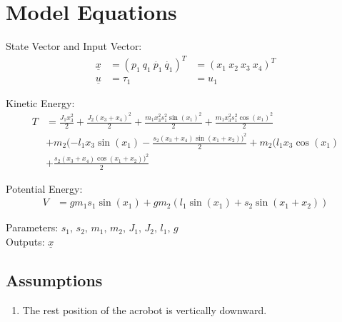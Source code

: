 \documentclass[10pt,a4paper]{article}
\begin{document}
	
	\section{Model Equations} %
	
	State Vector and Input Vector:
	\begin{align*}
		\underline{x} &= (p_1 \ q_1 \ \dot{p_1} \ \dot{q_1})^T &= (x_1 \ x_2 \ x_3 \ x_4)^T \\
		\underline{u} &= \tau_1 &= u_1
	\end{align*}
	
	\noindent Kinetic Energy:			
	\begin{subequations}
	\begin{align*}
		T &= \frac{J_1x_3^2}{2} + \frac{J_2(x_3 + x_4)^2}{2} + \frac{m_1x_3^2s_1^2 \sin(x_1)^2}{2} + \frac{m_1x_3^2s_1^2 \cos(x_1)^2}{2} \\
		&+ m_2(-l_1x_3 \sin(x_1) - \frac{s_2(x_3 + x_4) \sin(x_1 + x_2))^2}{2} + m_2(l_1x_3 \cos(x_1) \\
		&+ \frac{s_2(x_3 + x_4) \cos(x_1 + x_2))^2}{2}
	\end{align*}
	\end{subequations}
	
	\noindent Potential Energy:			
	\begin{subequations}
	\begin{align*}
		V &= gm_1s_1\sin(x_1) + gm_2(l_1\sin(x_1) + s_2\sin(x_1 + x_2))
	\end{align*}
	\end{subequations}

	\noindent
	Parameters: $s_1, \, s_2, \, m_1, \, m_2, \, J_1 , \, J_2, \, l_1, \, g$ %
	\\
	Outputs: $\underline{x}$ %
	
	
	\subsection{Assumptions} %
		\begin{enumerate} %
			\item The rest position of the acrobot is vertically downward.  
		\end{enumerate}
	
\end{document}
